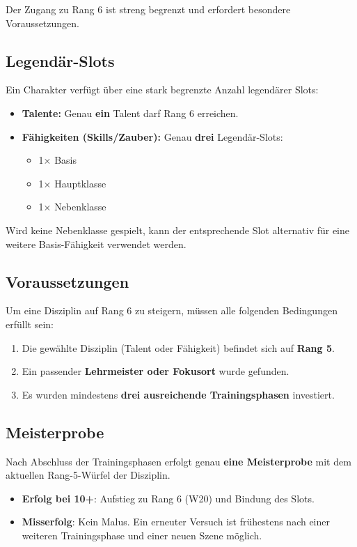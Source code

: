 Der Zugang zu Rang 6 ist streng begrenzt und erfordert besondere Voraussetzungen.

\subsection*{Legendär-Slots}

Ein Charakter verfügt über eine stark begrenzte Anzahl legendärer Slots:

\begin{itemize}
	\item \textbf{Talente:} Genau \textbf{ein} Talent darf Rang 6 erreichen.
	\item \textbf{Fähigkeiten (Skills/Zauber):} Genau \textbf{drei} Legendär-Slots:
	\begin{itemize}
		\item 1× Basis
		\item 1× Hauptklasse
		\item 1× Nebenklasse
	\end{itemize}
\end{itemize}

Wird keine Nebenklasse gespielt, kann der entsprechende Slot alternativ
für eine weitere Basis-Fähigkeit verwendet werden.

\subsection*{Voraussetzungen}

Um eine Disziplin auf Rang 6 zu steigern, müssen alle folgenden Bedingungen erfüllt sein:

\begin{enumerate}
	\item Die gewählte Disziplin (Talent oder Fähigkeit) befindet sich auf \textbf{Rang 5}.
	\item Ein passender \textbf{Lehrmeister oder Fokusort} wurde gefunden.
	\item Es wurden mindestens \textbf{drei ausreichende Trainingsphasen} investiert.
\end{enumerate}

\subsection*{Meisterprobe}

Nach Abschluss der Trainingsphasen erfolgt genau \textbf{eine Meisterprobe}
mit dem aktuellen Rang-5-Würfel der Disziplin.

\begin{itemize}
	\item \textbf{Erfolg bei 10+}: Aufstieg zu Rang 6 (W20) und Bindung des Slots.
	\item \textbf{Misserfolg}: Kein Malus. Ein erneuter Versuch ist frühestens
	nach einer weiteren Trainingsphase und einer neuen Szene möglich.
\end{itemize}

